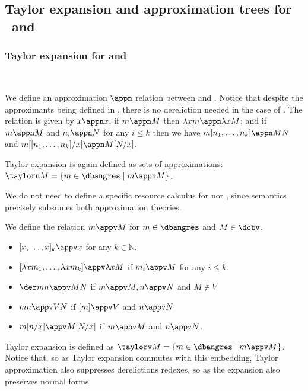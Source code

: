 \subsection{Taylor expansion and  approximation trees for \dcbn\ and \dcbv}


\subsubsection{Taylor expansion for \dcbn{} and \dcbv{}}

\begin{definition}\label{def:dcbn_taylor_approx}~
	
	We define an approximation $\appn$ relation between
		\dbangres and
		\dcbn. Notice that despite the approximants being defined in
		\dbangres, there is no dereliction needed in the case of
		\dcbn. The relation is given by $x\appn x$; if $m\appn M$ then
		$\lambda xm\appn \lambda xM$; and if $m\appn M$ and $n_i\appn
		N$ for any $i\leq k$ then we have $m[n_1,\dots ,n_k]\appn MN$ and
		$m[[n_1,\dots ,n_k]/x]\appn M[N/x]$.

	Taylor expansion is again defined as sets of approximations: $\taylorn
	M=\{m\in\dbangres\mid m\appn M\}$.
\end{definition}
We do not need to define a specific
		resource calculus for \dcbn{} nor \dcbv{}, since \dbangres{}
		semantics precisely subsumes both approximation theories. 

\begin{remark}
\end{remark}



\begin{definition}\label{def:dcbv_taylor_approx}
	We define the relation $m\appv M$ for $m\in\dbangres$ and $M\in\dcbv$.
	\begin{itemize}
		\item $[x,\dots ,x]_k\appv x$ for any $k\in\mathbb N$.
		\item $[\lambda xm_1,\dots ,\lambda xm_k]\appv \lambda xM$ if
			$m_i\appv M$ for
			any $i\leq k$.
		\item $ \der mn\appv MN$ if $m\appv M, n\appv N$ and
				$M\notin V$
		\item $mn\appv VN$ if $[m]\appv V$ and $n\appv N$


		\item $m[n/x]\appv M[N/x]$ if $m\appv M$ and $n\appv N$.
	\end{itemize}
	
	Taylor expansion is defined as $\taylorv M=\{m\in\dbangres\mid m\appv
	M\}$. Notice that, so as Taylor expansion commutes with this embedding,
	Taylor approximation also suppresses derelictions redexes, so as the
	expansion also preserves normal forms.
\end{definition}


